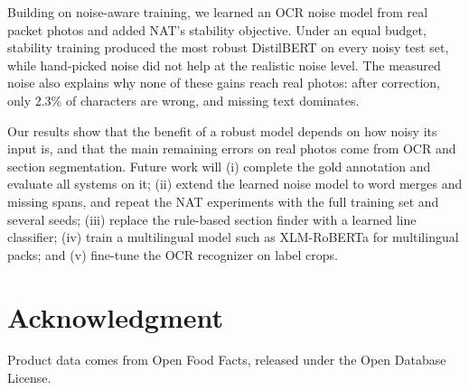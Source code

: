 \documentclass[conference]{IEEEtran}
\begin{document}
Building on noise-aware training, we learned an OCR noise model from real packet photos and added NAT's stability objective. Under an equal budget, stability training produced the most robust DistilBERT on every noisy test set, while hand-picked noise did not help at the realistic noise level. The measured noise also explains why none of these gains reach real photos: after correction, only 2.3\% of characters are wrong, and missing text dominates.

Our results show that the benefit of a robust model depends on how noisy its input is, and that the main remaining errors on real photos come from OCR and section segmentation. Future work will (i) complete the gold annotation and evaluate all systems on it; (ii) extend the learned noise model to word merges and missing spans, and repeat the NAT experiments with the full training set and several seeds; (iii) replace the rule-based section finder with a learned line classifier; (iv) train a multilingual model such as XLM-RoBERTa for multilingual packs; and (v) fine-tune the OCR recognizer on label crops.

\section*{Acknowledgment}
Product data comes from Open Food Facts, released under the Open Database License. %
\end{document}
